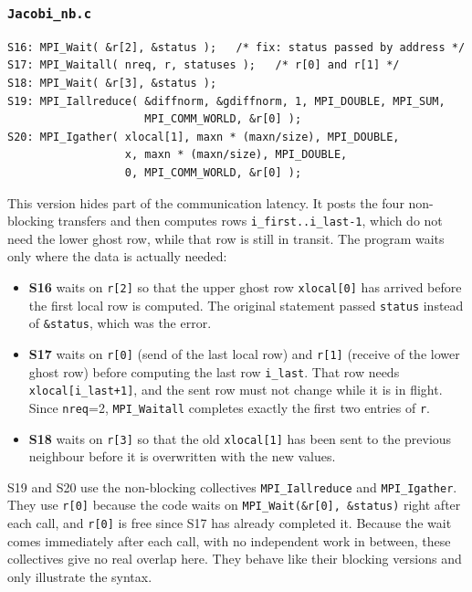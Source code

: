 \documentclass[11pt,a4paper]{article}
\begin{document}
\subsubsection*{\texttt{Jacobi\_nb.c}}
\begin{lstlisting}
S16: MPI_Wait( &r[2], &status );   /* fix: status passed by address */
S17: MPI_Waitall( nreq, r, statuses );   /* r[0] and r[1] */
S18: MPI_Wait( &r[3], &status );
S19: MPI_Iallreduce( &diffnorm, &gdiffnorm, 1, MPI_DOUBLE, MPI_SUM,
                     MPI_COMM_WORLD, &r[0] );
S20: MPI_Igather( xlocal[1], maxn * (maxn/size), MPI_DOUBLE,
                  x, maxn * (maxn/size), MPI_DOUBLE,
                  0, MPI_COMM_WORLD, &r[0] );
\end{lstlisting}
This version hides part of the communication latency. It posts the four non-blocking transfers and then computes rows \texttt{i\_first..i\_last-1}, which do not need the lower ghost row, while that row is still in transit. The program waits only where the data is actually needed:
\begin{itemize}
  \item \textbf{S16} waits on \texttt{r[2]} so that the upper ghost row \texttt{xlocal[0]} has arrived before the first local row is computed. The original statement passed \texttt{status} instead of \texttt{\&status}, which was the error.
  \item \textbf{S17} waits on \texttt{r[0]} (send of the last local row) and \texttt{r[1]} (receive of the lower ghost row) before computing the last row \texttt{i\_last}. That row needs \texttt{xlocal[i\_last+1]}, and the sent row must not change while it is in flight. Since \texttt{nreq}=2, \texttt{MPI\_Waitall} completes exactly the first two entries of \texttt{r}.
  \item \textbf{S18} waits on \texttt{r[3]} so that the old \texttt{xlocal[1]} has been sent to the previous neighbour before it is overwritten with the new values.
\end{itemize}
S19 and S20 use the non-blocking collectives \texttt{MPI\_Iallreduce} and \texttt{MPI\_Igather}. They use \texttt{r[0]} because the code waits on \texttt{MPI\_Wait(\&r[0], \&status)} right after each call, and \texttt{r[0]} is free since S17 has already completed it. Because the wait comes immediately after each call, with no independent work in between, these collectives give no real overlap here. They behave like their blocking versions and only illustrate the syntax.
\end{document}
